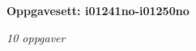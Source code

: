 \centerline{\bf Oppgavesett: i01241no-i01250no}
\vskip 10pt
\centerline{\it 10 oppgaver}\vskip 10pt
\vskip 10pt
